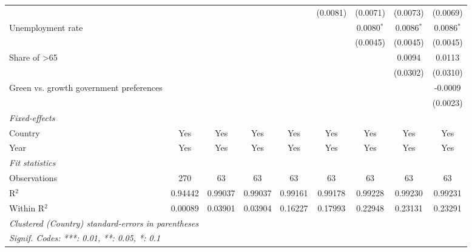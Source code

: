 \begin{table}[htbp]
\begin{tabular}{lcccccccc}
                                                                              &          &          &          &              & (0.0081)     & (0.0071)     & (0.0073)     & (0.0069)\\   
      Unemployment rate                                                       &          &          &          &              &              & 0.0080$^{*}$ & 0.0086$^{*}$ & 0.0086$^{*}$\\   
                                                                              &          &          &          &              &              & (0.0045)     & (0.0045)     & (0.0045)\\   
      Share of >65                                                            &          &          &          &              &              &              & 0.0094       & 0.0113\\   
                                                                              &          &          &          &              &              &              & (0.0302)     & (0.0310)\\   
      Green vs. growth government preferences                                 &          &          &          &              &              &              &              & -0.0009\\   
                                                                              &          &          &          &              &              &              &              & (0.0023)\\   
      \midrule
      \emph{Fixed-effects}\\
      Country                                                                 & Yes      & Yes      & Yes      & Yes          & Yes          & Yes          & Yes          & Yes\\  
      Year                                                                    & Yes      & Yes      & Yes      & Yes          & Yes          & Yes          & Yes          & Yes\\  
      \midrule
      \emph{Fit statistics}\\
      Observations                                                            & 270      & 63       & 63       & 63           & 63           & 63           & 63           & 63\\  
      R$^2$                                                                   & 0.94442  & 0.99037  & 0.99037  & 0.99161      & 0.99178      & 0.99228      & 0.99230      & 0.99231\\  
      Within R$^2$                                                            & 0.00089  & 0.03901  & 0.03904  & 0.16227      & 0.17993      & 0.22948      & 0.23131      & 0.23291\\  
      \midrule \midrule
      \multicolumn{9}{l}{\emph{Clustered (Country) standard-errors in parentheses}}\\
      \multicolumn{9}{l}{\emph{Signif. Codes: ***: 0.01, **: 0.05, *: 0.1}}\\
   \end{tabular}
\end{table}


